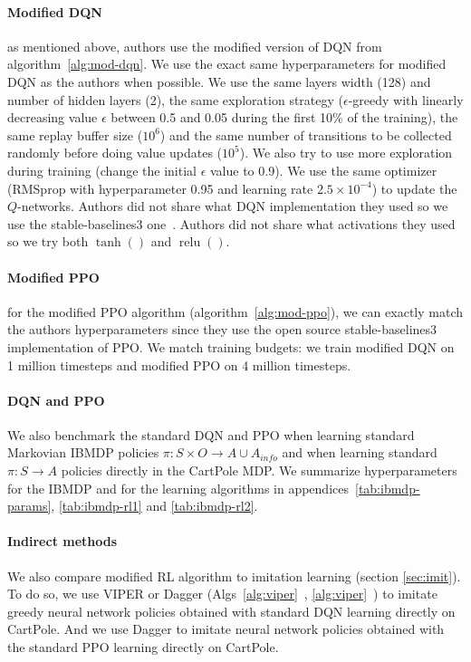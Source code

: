 \paragraph{Modified DQN} as mentioned above, authors use the modified version of DQN from algorithm~\ref{alg:mod-dqn}.
We use the exact same hyperparameters for modified DQN as the authors when possible. 
We use the same layers width (128) and number of hidden layers (2), the same exploration strategy ($\epsilon$-greedy with linearly decreasing value $\epsilon$ between 0.5 and 0.05 during the first 10\% of the training),
the same replay buffer size ($10^6$) and the same number of transitions to be collected randomly before doing value updates ($10^5$).
We also try to use more exploration during training (change the initial $\epsilon$ value to 0.9).
We use the same optimizer (RMSprop with hyperparameter 0.95 and learning rate $2.5 \times 10^{-4}$) to update the $Q$-networks.
Authors did not share what DQN implementation they used so we use the stable-baselines3 one~\cite{stable-baselines3}.
Authors did not share what activations they used so we try both $\operatorname{tanh}()$ and $\operatorname{relu}()$. 

\paragraph{Modified PPO} for the modified PPO algorithm (algorithm~\ref{alg:mod-ppo}), we can exactly match the authors hyperparameters since they use the open source stable-baselines3 implementation of PPO.
We match training budgets: we train modified DQN on 1 million timesteps and modified PPO on 4 million timesteps.

\paragraph{DQN and PPO} We also benchmark the standard DQN and PPO when learning standard Markovian IBMDP policies $\pi:S\times O\rightarrow A\cup A_{info}$ and when learning standard $\pi:S\rightarrow A$ policies directly in the CartPole MDP.
We summarize hyperparameters for the IBMDP and for the learning algorithms in appendices~\ref{tab:ibmdp-params}, \ref{tab:ibmdp-rl1} and \ref{tab:ibmdp-rl2}.

\paragraph{Indirect methods} We also compare modified RL algorithm to imitation learning (section \ref{sec:imit}).
To do so, we use VIPER or Dagger (Algs~\ref{alg:viper}~\cite{dagger}, \ref{alg:viper}~\cite{viper}) to imitate greedy neural network policies obtained with standard DQN learning directly on CartPole.
And we use Dagger to imitate neural network policies obtained with the standard PPO learning directly on CartPole. 

